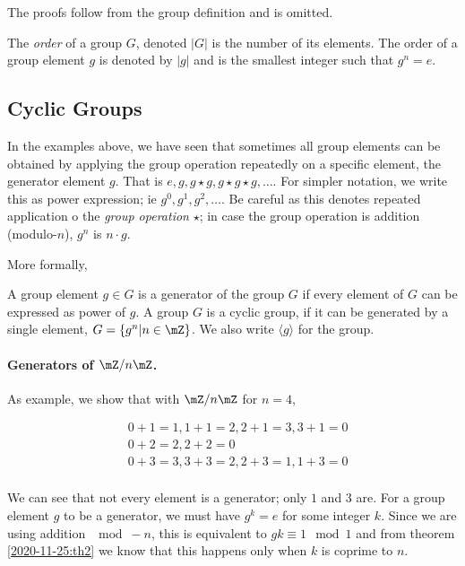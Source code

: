 The proofs follow from the group definition and is omitted.


\begin{definition}
  The \emph{order} of a group $G$, denoted $|G|$ is the number of its elements. The order of a group element $g$ is denoted by $|g|$ and is the smallest integer such that $g^n = e$.
\end{definition}

\subsection{Cyclic Groups}

In the examples above, we have seen that sometimes all group elements can be obtained by applying the group operation repeatedly on a specific element, the generator element $g$. That is $e, g, g \star g, g \star g \star g, \ldots$. For simpler notation, we write this as power expression; ie $g^0, g^1, g^2, \ldots$. Be careful as this denotes repeated application o the \emph{group operation} $\star$; in case the group operation is addition (modulo-$n$), $g^n$ is $n \cdot g$.

More formally,

\begin{definition}
    A group element $g \in G$ is a generator of the group $G$ if every element of $G$ can be expressed as power of $g$. A group $G$ is a cyclic group, if it can be generated by a single element, $G = \{g^n | n \in \mZ\}$. We also write $\langle g \rangle$ for the group.
\end{definition}

\paragraph{Generators of $\mZ / n \mZ$.} As example, we show that with $\mZ / n \mZ$ for $n=4$,

\begin{align*}
    &0 + 1 = 1, 1 + 1 = 2, 2 + 1 = 3, 3 + 1 = 0 \\
    &0 + 2 = 2, 2 + 2 = 0 \\
    &0 + 3 = 3, 3 + 3 = 2, 2 + 3 = 1, 1 + 3 = 0\\
\end{align*}

We can see that not every element is a generator; only $1$ and $3$ are. For a group element $g$ to be a generator, we must have $g^k = e$ for some integer $k$. Since we are using addition $\mod-n$, this is equivalent to $gk \equiv 1 \mod 1$ and from theorem \ref{2020-11-25:th2} we know that this happens only when $k$ is coprime to $n$.

